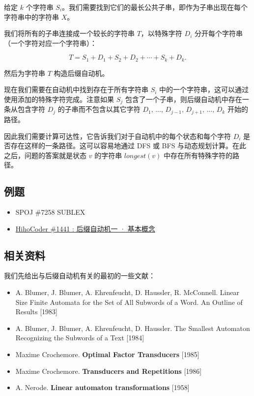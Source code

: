 \begin{QUOTE}{}{}
给定 $k$ 个字符串 $S_i$。我们需要找到它们的最长公共子串，即作为子串出现在每个字符串中的字符串 $X$。
\end{QUOTE}

我们将所有的子串连接成一个较长的字符串 $T$，以特殊字符 $D_i$ 分开每个字符串（一个字符对应一个字符串）：

$$
T=S_1+D_1+S_2+D_2+\cdots+S_k+D_k.
$$

然后为字符串 $T$ 构造后缀自动机。

现在我们需要在自动机中找到存在于所有字符串 $S_i$ 中的一个字符串，这可以通过使用添加的特殊字符完成。注意如果 $S_j$ 包含了一个子串，则后缀自动机中存在一条从包含字符 $D_j$ 的子串而不包含以其它字符 $D_1,\,\ldots,\,D_{j-1},\,D_{j+1},\,\ldots,\,D_k$ 开始的路径。

因此我们需要计算可达性，它告诉我们对于自动机中的每个状态和每个字符 $D_i$ 是否存在这样的一条路径。这可以容易地通过 DFS 或 BFS 与动态规划计算。在此之后，问题的答案就是状态 $v$ 的字符串 $longest(v)$ 中存在所有特殊字符的路径。

\subsection{例题}

\begin{itemize}
\item SPOJ \#7258 SUBLEX
\item \href{http://hihocoder.com/problemset/problem/1441}{HihoCoder \#1441 : 后缀自动机一 · 基本概念}
\end{itemize}

\subsection{相关资料}

我们先给出与后缀自动机有关的最初的一些文献：

\begin{itemize}
\item A. Blumer, J. Blumer, A. Ehrenfeucht, D. Haussler, R. McConnell. Linear 
  Size Finite Automata for the Set of All Subwords of a Word. An Outline of 
  Results [1983]
\item A. Blumer, J. Blumer, A. Ehrenfeucht, D. Haussler. The Smallest Automaton 
  Recognizing the Subwords of a Text [1984]
\item Maxime Crochemore. \textbf{Optimal Factor Transducers} [1985]
\item Maxime Crochemore. \textbf{Transducers and Repetitions} [1986]
\item A. Nerode. \textbf{Linear automaton transformations} [1958]
\end{itemize}

